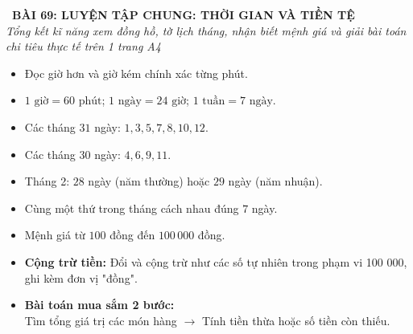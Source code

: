 \documentclass[11pt,a4paper]{article}
\begin{document}
\begin{tcolorbox}[
  enhanced,
  colback=white,
  colframe=primary,
  arc=3mm,
  boxrule=1.2pt,
  left=4mm, right=4mm, top=2.5mm, bottom=2.5mm,
  drop shadow=black!10!white
]
  \centering
  {\Large\bfseries\color{primary}\faBookmark\ BÀI 69: LUYỆN TẬP CHUNG: THỜI GIAN VÀ TIỀN TỆ}\\[1.5mm]
  {\small\itshape\color{black!75}Tổng kết kĩ năng xem đồng hồ, tờ lịch tháng, nhận biết mệnh giá và giải bài toán chi tiêu thực tế trên 1 trang A4}
\end{tcolorbox}

\vspace{-2mm}


\noindent
\begin{minipage}[t]{0.49\textwidth}\vspace{0pt}
\begin{tcolorbox}[
  enhanced,
  colback=blue!4!white,
  colframe=blue!75!black,
  arc=2mm, boxrule=0.8pt,
  left=2mm, right=2mm, top=1.8mm, bottom=1.8mm,
  title={\footnotesize\bfseries\color{white}\faClockO\ 1. Mạch Thời gian cốt lõi}
]
{\footnotesize
\begin{itemize}\setlength{\itemsep}{1.5pt}\setlength{\leftskip}{-2.5mm}
  \item Đọc giờ hơn và giờ kém chính xác từng phút.
  \item $1\text{ giờ} = 60\text{ phút}$; $1\text{ ngày} = 24\text{ giờ}$; $1\text{ tuần} = 7\text{ ngày}$.
  \item Các tháng $31$ ngày: $1, 3, 5, 7, 8, 10, 12$.
  \item Các tháng $30$ ngày: $4, 6, 9, 11$.
  \item Tháng 2: $28$ ngày (năm thường) hoặc $29$ ngày (năm nhuận).
  \item Cùng một thứ trong tháng cách nhau đúng $7$ ngày.
\end{itemize}
}
\end{tcolorbox}
\end{minipage}
\hfill
\begin{minipage}[t]{0.49\textwidth}\vspace{0pt}
\begin{tcolorbox}[
  enhanced,
  colback=teal!4!white,
  colframe=teal!75!black,
  arc=2mm, boxrule=0.8pt,
  left=2mm, right=2mm, top=1.8mm, bottom=1.8mm,
  title={\footnotesize\bfseries\color{white}\faCheckSquare\ 2. Mạch Tiền tệ thực tiễn}
]
{\footnotesize
\begin{itemize}\setlength{\itemsep}{1.5pt}\setlength{\leftskip}{-2.5mm}
  \item Mệnh giá từ $100$ đồng đến $100\,000$ đồng.
  \item \textbf{Cộng trừ tiền:} Đổi và cộng trừ như các số tự nhiên trong phạm vi 100 000, ghi kèm đơn vị "đồng".
  \item \textbf{Bài toán mua sắm 2 bước:}\\
  Tìm tổng giá trị các món hàng $\to$ Tính tiền thừa hoặc số tiền còn thiếu.
\end{itemize}
}
\end{tcolorbox}
\end{minipage}
\end{document}
